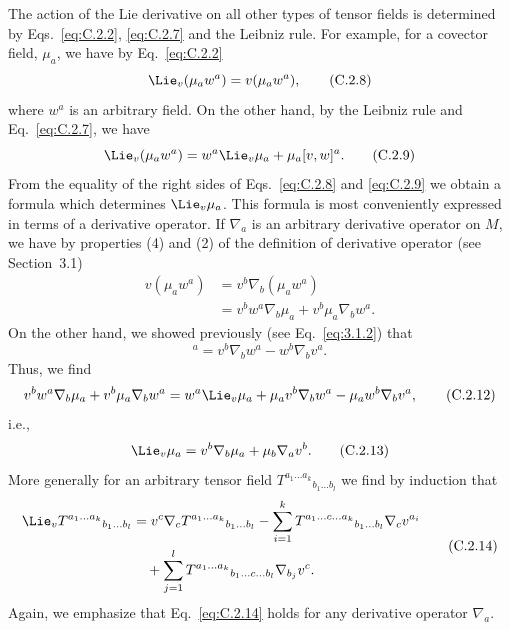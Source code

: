 The action of the Lie derivative on all other types of tensor fields is determined by
Eqs.~\eqref{eq:C.2.2}, \eqref{eq:C.2.7} and the Leibniz rule. For example, for a
covector field, \(\mu_a\), we have by Eq.~\eqref{eq:C.2.2}
\begin{equation}
  \Lie_v(\mu_aw^a)=v(\mu_aw^a),
  \tag{C.2.8}\label{eq:C.2.8}
\end{equation}
where \(w^a\) is an arbitrary field. On the other hand, by the Leibniz rule and
Eq.~\eqref{eq:C.2.7}, we have
\begin{equation}
  \Lie_v(\mu_aw^a)=w^a\Lie_v\mu_a+\mu_a[v,w]^a.
  \tag{C.2.9}\label{eq:C.2.9}
\end{equation}
From the equality of the right sides of Eqs.~\eqref{eq:C.2.8} and \eqref{eq:C.2.9}
we obtain a formula which determines \(\Lie_v\mu_a\). This formula is most
conveniently expressed in terms of a derivative operator. If \(\nabla_a\) is an
arbitrary derivative operator on \(M\), we have by properties (4) and (2) of the
definition of derivative operator (see Section~3.1)
\begin{equation}
\begin{aligned}
  v(\mu_aw^a)
  &=v^b\nabla_b(\mu_aw^a)\\
  &=v^bw^a\nabla_b\mu_a+v^b\mu_a\nabla_bw^a.
\end{aligned}
  \tag{C.2.10}\label{eq:C.2.10}
\end{equation}
On the other hand, we showed previously (see Eq.~\eqref{eq:3.1.2}) that
\begin{equation}
  [v,w]^a=v^b\nabla_bw^a-w^b\nabla_bv^a.
  \tag{C.2.11}\label{eq:C.2.11}
\end{equation}
Thus, we find
\begin{equation}
  v^bw^a\nabla_b\mu_a+v^b\mu_a\nabla_bw^a
  =w^a\Lie_v\mu_a+\mu_av^b\nabla_bw^a-\mu_aw^b\nabla_bv^a,
  \tag{C.2.12}\label{eq:C.2.12}
\end{equation}
i.e.,
\begin{equation}
  \Lie_v\mu_a=v^b\nabla_b\mu_a+\mu_b\nabla_av^b.
  \tag{C.2.13}\label{eq:C.2.13}
\end{equation}
More generally for an arbitrary tensor field
\(T^{a_1\ldots a_k}{}_{b_1\ldots b_l}\) we find by induction that
\begin{equation}
\begin{aligned}
  \Lie_vT^{a_1\ldots a_k}{}_{b_1\ldots b_l}
  & =v^c\nabla_cT^{a_1\ldots a_k}{}_{b_1\ldots b_l}
  -\sum_{i=1}^{k}
  T^{a_1\ldots c\ldots a_k}{}_{b_1\ldots b_l}\nabla_cv^{a_i}\\
  &\quad +\sum_{j=1}^{l}
  T^{a_1\ldots a_k}{}_{b_1\ldots c\ldots b_l}\nabla_{b_j}v^c.
\end{aligned}
  \tag{C.2.14}\label{eq:C.2.14}
\end{equation}
Again, we emphasize that Eq.~\eqref{eq:C.2.14} holds for any derivative operator
\(\nabla_a\).

